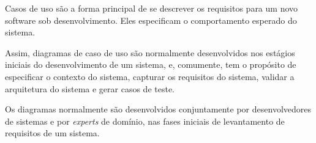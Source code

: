 Casos de uso são a forma principal de se descrever os requisitos para um novo software sob desenvolvimento. Eles especificam o comportamento esperado do sistema.

Assim, diagramas de caso de uso são normalmente desenvolvidos nos estágios iniciais do desenvolvimento de um sistema, e, comumente, tem o propósito de especificar o contexto do sistema, capturar os requisitos do sistema, validar a arquitetura do sistema e gerar casos de teste.

Os diagramas normalmente são desenvolvidos conjuntamente por desenvolvedores de sistemas e por \textit{experts} de domínio, nas fases iniciais de levantamento de requisitos de um sistema. 